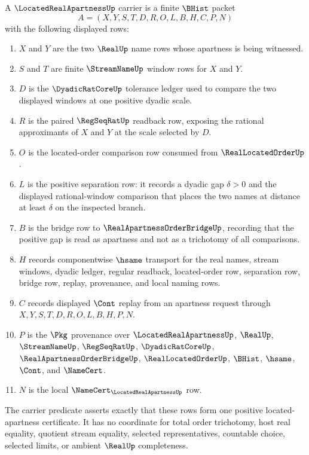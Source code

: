 \begin{definition}
\label{def:located-real-apartness-carrier}
A $\LocatedRealApartnessUp$ carrier is a finite $\BHist$ packet
$$
A=(X,Y,S,T,D,R,O,L,B,H,C,P,N)
$$
with the following displayed rows:
\begin{enumerate}
\item $X$ and $Y$ are the two $\RealUp$ name rows whose apartness is being witnessed.
\item $S$ and $T$ are finite $\StreamNameUp$ window rows for $X$ and $Y$.
\item $D$ is the $\DyadicRatCoreUp$ tolerance ledger used to compare the two displayed windows at one positive dyadic scale.
\item $R$ is the paired $\RegSeqRatUp$ readback row, exposing the rational approximants of $X$ and $Y$ at the scale selected by $D$.
\item $O$ is the located-order comparison row consumed from $\RealLocatedOrderUp$.
\item $L$ is the positive separation row: it records a dyadic gap $\delta>0$ and the displayed rational-window comparison that places the two names at distance at least $\delta$ on the inspected branch.
\item $B$ is the bridge row to $\RealApartnessOrderBridgeUp$, recording that the positive gap is read as apartness and not as a trichotomy of all comparisons.
\item $H$ records componentwise $\hsame$ transport for the real names, stream windows, dyadic ledger, regular readback, located-order row, separation row, bridge row, replay, provenance, and local naming rows.
\item $C$ records displayed $\Cont$ replay from an apartness request through $X,Y,S,T,D,R,O,L,B,H,P,N$.
\item $P$ is the $\Pkg$ provenance over $\LocatedRealApartnessUp$, $\RealUp$, $\StreamNameUp$, $\RegSeqRatUp$, $\DyadicRatCoreUp$, $\RealApartnessOrderBridgeUp$, $\RealLocatedOrderUp$, $\BHist$, $\hsame$, $\Cont$, and $\NameCert$.
\item $N$ is the local $\NameCert_{\LocatedRealApartnessUp}$ row.
\end{enumerate}
The carrier predicate asserts exactly that these rows form one positive located-apartness certificate. It has no coordinate for total order trichotomy, host real equality, quotient stream equality, selected representatives, countable choice, selected limits, or ambient $\RealUp$ completeness.
\end{definition}


